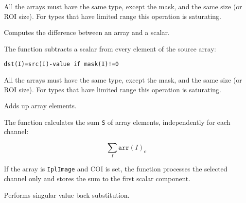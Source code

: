 All the arrays must have the same type, except the mask, and the same size (or ROI size).
For types that have limited range this operation is saturating.

Computes the difference between an array and a scalar.


\begin{description}
\end{description}

The function subtracts a scalar from every element of the source array:

\begin{lstlisting}
dst(I)=src(I)-value if mask(I)!=0
\end{lstlisting}

All the arrays must have the same type, except the mask, and the same size (or ROI size).
For types that have limited range this operation is saturating.


Adds up array elements.


\begin{description}
\end{description}


The function calculates the sum \texttt{S} of array elements, independently for each channel:

\[ \sum_I \texttt{arr}(I)_c \]

If the array is \texttt{IplImage} and COI is set, the function processes the selected channel only and stores the sum to the first scalar component.


Performs singular value back substitution.


